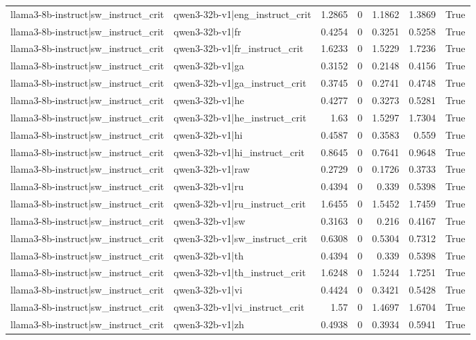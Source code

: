 \begin{table}
\begin{tabular}{l l r r r r l}
llama3-8b-instruct|sw_instruct_crit & qwen3-32b-v1|eng_instruct_crit & 1.2865 & 0 & 1.1862 & 1.3869 & True \\
llama3-8b-instruct|sw_instruct_crit & qwen3-32b-v1|fr & 0.4254 & 0 & 0.3251 & 0.5258 & True \\
llama3-8b-instruct|sw_instruct_crit & qwen3-32b-v1|fr_instruct_crit & 1.6233 & 0 & 1.5229 & 1.7236 & True \\
llama3-8b-instruct|sw_instruct_crit & qwen3-32b-v1|ga & 0.3152 & 0 & 0.2148 & 0.4156 & True \\
llama3-8b-instruct|sw_instruct_crit & qwen3-32b-v1|ga_instruct_crit & 0.3745 & 0 & 0.2741 & 0.4748 & True \\
llama3-8b-instruct|sw_instruct_crit & qwen3-32b-v1|he & 0.4277 & 0 & 0.3273 & 0.5281 & True \\
llama3-8b-instruct|sw_instruct_crit & qwen3-32b-v1|he_instruct_crit & 1.63 & 0 & 1.5297 & 1.7304 & True \\
llama3-8b-instruct|sw_instruct_crit & qwen3-32b-v1|hi & 0.4587 & 0 & 0.3583 & 0.559 & True \\
llama3-8b-instruct|sw_instruct_crit & qwen3-32b-v1|hi_instruct_crit & 0.8645 & 0 & 0.7641 & 0.9648 & True \\
llama3-8b-instruct|sw_instruct_crit & qwen3-32b-v1|raw & 0.2729 & 0 & 0.1726 & 0.3733 & True \\
llama3-8b-instruct|sw_instruct_crit & qwen3-32b-v1|ru & 0.4394 & 0 & 0.339 & 0.5398 & True \\
llama3-8b-instruct|sw_instruct_crit & qwen3-32b-v1|ru_instruct_crit & 1.6455 & 0 & 1.5452 & 1.7459 & True \\
llama3-8b-instruct|sw_instruct_crit & qwen3-32b-v1|sw & 0.3163 & 0 & 0.216 & 0.4167 & True \\
llama3-8b-instruct|sw_instruct_crit & qwen3-32b-v1|sw_instruct_crit & 0.6308 & 0 & 0.5304 & 0.7312 & True \\
llama3-8b-instruct|sw_instruct_crit & qwen3-32b-v1|th & 0.4394 & 0 & 0.339 & 0.5398 & True \\
llama3-8b-instruct|sw_instruct_crit & qwen3-32b-v1|th_instruct_crit & 1.6248 & 0 & 1.5244 & 1.7251 & True \\
llama3-8b-instruct|sw_instruct_crit & qwen3-32b-v1|vi & 0.4424 & 0 & 0.3421 & 0.5428 & True \\
llama3-8b-instruct|sw_instruct_crit & qwen3-32b-v1|vi_instruct_crit & 1.57 & 0 & 1.4697 & 1.6704 & True \\
llama3-8b-instruct|sw_instruct_crit & qwen3-32b-v1|zh & 0.4938 & 0 & 0.3934 & 0.5941 & True \\

\end{tabular}
\end{table}
